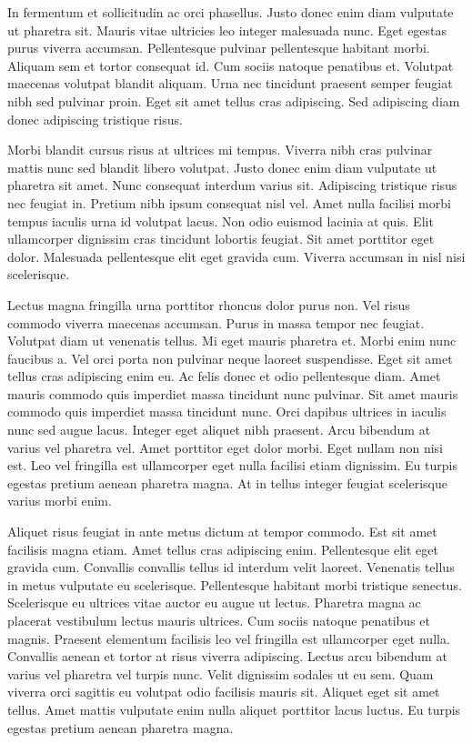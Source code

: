 \documentclass[11pt,a4paper]{article}
\begin{document}
In fermentum et sollicitudin ac orci phasellus. Justo donec enim diam vulputate ut pharetra sit. Mauris vitae ultricies leo integer malesuada nunc. Eget egestas purus viverra accumsan. Pellentesque pulvinar pellentesque habitant morbi. Aliquam sem et tortor consequat id. Cum sociis natoque penatibus et. Volutpat maecenas volutpat blandit aliquam. Urna nec tincidunt praesent semper feugiat nibh sed pulvinar proin. Eget sit amet tellus cras adipiscing. Sed adipiscing diam donec adipiscing tristique risus.

Morbi blandit cursus risus at ultrices mi tempus. Viverra nibh cras pulvinar mattis nunc sed blandit libero volutpat. Justo donec enim diam vulputate ut pharetra sit amet. Nunc consequat interdum varius sit. Adipiscing tristique risus nec feugiat in. Pretium nibh ipsum consequat nisl vel. Amet nulla facilisi morbi tempus iaculis urna id volutpat lacus. Non odio euismod lacinia at quis. Elit ullamcorper dignissim cras tincidunt lobortis feugiat. Sit amet porttitor eget dolor. Malesuada pellentesque elit eget gravida cum. Viverra accumsan in nisl nisi scelerisque.

Lectus magna fringilla urna porttitor rhoncus dolor purus non. Vel risus commodo viverra maecenas accumsan. Purus in massa tempor nec feugiat. Volutpat diam ut venenatis tellus. Mi eget mauris pharetra et. Morbi enim nunc faucibus a. Vel orci porta non pulvinar neque laoreet suspendisse. Eget sit amet tellus cras adipiscing enim eu. Ac felis donec et odio pellentesque diam. Amet mauris commodo quis imperdiet massa tincidunt nunc pulvinar. Sit amet mauris commodo quis imperdiet massa tincidunt nunc. Orci dapibus ultrices in iaculis nunc sed augue lacus. Integer eget aliquet nibh praesent. Arcu bibendum at varius vel pharetra vel. Amet porttitor eget dolor morbi. Eget nullam non nisi est. Leo vel fringilla est ullamcorper eget nulla facilisi etiam dignissim. Eu turpis egestas pretium aenean pharetra magna. At in tellus integer feugiat scelerisque varius morbi enim.

Aliquet risus feugiat in ante metus dictum at tempor commodo. Est sit amet facilisis magna etiam. Amet tellus cras adipiscing enim. Pellentesque elit eget gravida cum. Convallis convallis tellus id interdum velit laoreet. Venenatis tellus in metus vulputate eu scelerisque. Pellentesque habitant morbi tristique senectus. Scelerisque eu ultrices vitae auctor eu augue ut lectus. Pharetra magna ac placerat vestibulum lectus mauris ultrices. Cum sociis natoque penatibus et magnis. Praesent elementum facilisis leo vel fringilla est ullamcorper eget nulla. Convallis aenean et tortor at risus viverra adipiscing. Lectus arcu bibendum at varius vel pharetra vel turpis nunc. Velit dignissim sodales ut eu sem. Quam viverra orci sagittis eu volutpat odio facilisis mauris sit. Aliquet eget sit amet tellus. Amet mattis vulputate enim nulla aliquet porttitor lacus luctus. Eu turpis egestas pretium aenean pharetra magna.
\end{document}
